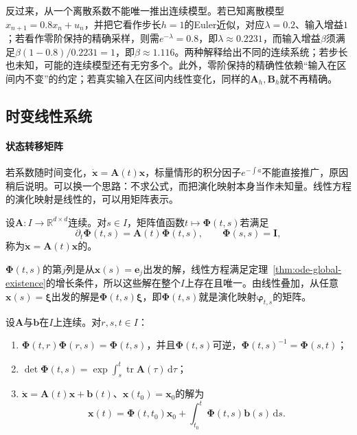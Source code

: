 反过来，从一个离散系数不能唯一推出连续模型。若已知离散模型$x_{n+1}=0.8x_n+u_n$，并把它看作步长$h=1$的Euler近似，对应$\lambda=0.2$、输入增益$1$；若看作零阶保持的精确采样，则需$e^{-\lambda}=0.8$，即$\lambda\approx0.2231$，而输入增益$\beta$须满足$\beta(1-0.8)/0.2231=1$，即$\beta\approx1.116$。两种解释给出不同的连续系统；若步长也未知，可能的连续模型还有无穷多个。此外，零阶保持的精确性依赖“输入在区间内不变”的约定；若真实输入在区间内线性变化，同样的$\bm A_h,\bm B_h$就不再精确。

\subsection{时变线性系统}
\label{sec:ode-time-varying-linear}

\paragraph{状态转移矩阵}
若系数随时间变化，$\dot{\bm x}=\bm A(t)\bm x$，标量情形的积分因子$e^{-\int a}$不能直接推广，原因稍后说明。可以换一个思路：不求公式，而把演化映射本身当作未知量。线性方程的演化映射是线性的，可以用矩阵表示。

\begin{definition}[状态转移矩阵]
  \label{def:ode-state-transition-matrix}
  设$\bm A:I\to\mathbb R^{d\times d}$连续。对$s\in I$，矩阵值函数$t\mapsto\bm\Phi(t,s)$若满足
  \begin{equation}
    \partial_t\bm\Phi(t,s)=\bm A(t)\bm\Phi(t,s),\qquad\bm\Phi(s,s)=\bm I,
    \label{eq:ode-state-transition}
  \end{equation}
  称为$\dot{\bm x}=\bm A(t)\bm x$的。
\end{definition}

$\bm\Phi(t,s)$的第$j$列是从$\bm x(s)=\bm e_j$出发的解，线性方程满足定理~\ref{thm:ode-global-existence}的增长条件，所以这些解在整个$I$上存在且唯一。由线性叠加，从任意$\bm x(s)=\bm\xi$出发的解是$\bm\Phi(t,s)\bm\xi$，即$\bm\Phi(t,s)$就是演化映射$\bm\varphi_{t,s}$的矩阵。

\begin{theorem}[状态转移矩阵的性质]
  \label{thm:ode-state-transition-properties}
  设$\bm A$与$\bm b$在$I$上连续。对$r,s,t\in I$：
  \begin{enumerate}
    \item $\bm\Phi(t,r)\bm\Phi(r,s)=\bm\Phi(t,s)$，并且$\bm\Phi(t,s)$可逆，$\bm\Phi(t,s)^{-1}=\bm\Phi(s,t)$；
    \item $\det\bm\Phi(t,s)=\exp\int_s^t\operatorname{tr}\bm A(\tau)\,\mathrm d\tau$；
    \item $\dot{\bm x}=\bm A(t)\bm x+\bm b(t)$、$\bm x(t_0)=\bm x_0$的解为
    \begin{equation}
      \bm x(t)=\bm\Phi(t,t_0)\bm x_0+\int_{t_0}^t\bm\Phi(t,s)\bm b(s)\,\mathrm ds.
      \label{eq:ode-ltv-variation}
    \end{equation}
  \end{enumerate}
\end{theorem}

